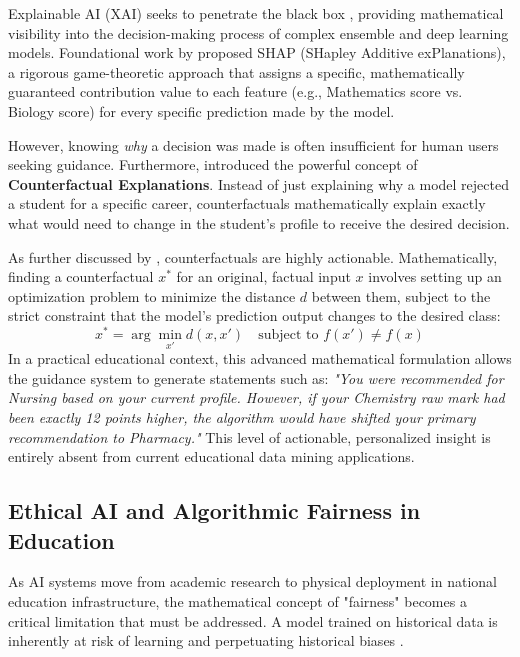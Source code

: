 Explainable AI (XAI) seeks to penetrate the black box \parencite{wachter2017counterfactual}, providing mathematical visibility into the decision-making process of complex ensemble and deep learning models. Foundational work by \textcite{lundberg2017unified} proposed SHAP (SHapley Additive exPlanations), a rigorous game-theoretic approach that assigns a specific, mathematically guaranteed contribution value to each feature (e.g., Mathematics score vs. Biology score) for every specific prediction made by the model. 

However, knowing \textit{why} a decision was made is often insufficient for human users seeking guidance. Furthermore, \textcite{wachter2017counterfactual} introduced the powerful concept of \textbf{Counterfactual Explanations}. Instead of just explaining why a model rejected a student for a specific career, counterfactuals mathematically explain exactly what would need to change in the student's profile to receive the desired decision. 

As further discussed by \textcite{barocas2020hidden}, counterfactuals are highly actionable. Mathematically, finding a counterfactual \parencite{wachter2017counterfactual} $x^*$ for an original, factual input $x$ involves setting up an optimization problem to minimize the distance $d$ between them, subject to the strict constraint that the model's prediction output changes to the desired class:
\[
x^* = \arg\min_{x'} d(x,x') \quad \text{subject to } f(x') \neq f(x)
\]
In a practical educational context, this advanced mathematical formulation allows the guidance system to generate statements such as: \textit{"You were recommended for Nursing based on your current profile. However, if your Chemistry raw mark had been exactly 12 points higher, the algorithm would have shifted your primary recommendation to Pharmacy."} This level of actionable, personalized insight is entirely absent from current educational data mining applications.

\subsection{Ethical AI and Algorithmic Fairness in Education}

As AI systems move from academic research to physical deployment in national education infrastructure, the mathematical concept of "fairness" becomes a critical limitation that must be addressed. A model trained on historical data is inherently at risk of learning and perpetuating historical biases \autocite{barocas2016big}. 

